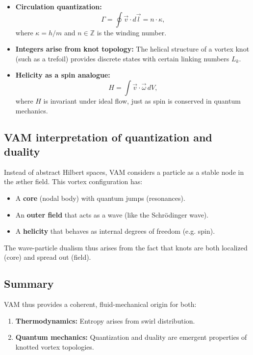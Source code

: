 \begin{itemize}
    \item \textbf{Circulation quantization:}
    \begin{equation}
        \Gamma = \oint \vec{v} \cdot d\vec{l} = n \cdot \kappa,
    \end{equation}
    where $\kappa = h/m$ and $n \in \mathbb{Z}$ is the winding number.
    \item \textbf{Integers arise from knot topology:} The helical structure of a vortex knot (such as a trefoil) provides discrete states with certain linking numbers $L_k$.
    \item \textbf{Helicity as a spin analogue:}
    \begin{equation}
        H = \int \vec{v} \cdot \vec{\omega} \, dV,
    \end{equation}
    where $H$ is invariant under ideal flow, just as spin is conserved in quantum mechanics.
\end{itemize}

\subsection{VAM interpretation of quantization and duality}

Instead of abstract Hilbert spaces, VAM considers a particle as a stable node in the æther field. This vortex configuration has:

\begin{itemize}
    \item A \textbf{core} (nodal body) with quantum jumps (resonances).
    \item An \textbf{outer field} that acts as a wave (like the Schrödinger wave).

    \item A \textbf{helicity} that behaves as internal degrees of freedom (e.g. spin).
\end{itemize}

The wave-particle dualism thus arises from the fact that knots are both localized (core) and spread out (field).

\subsection{Summary}

VAM thus provides a coherent, fluid-mechanical origin for both:

\begin{enumerate}
    \item \textbf{Thermodynamics:} Entropy arises from swirl distribution.
    \item \textbf{Quantum mechanics:} Quantization and duality are emergent properties of knotted vortex topologies.
\end{enumerate}

